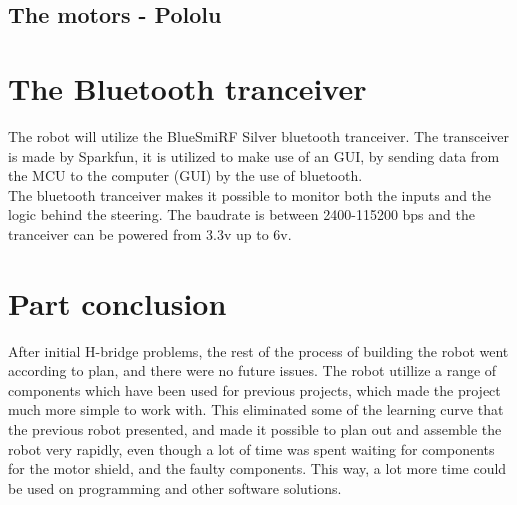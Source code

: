 \subsection{The motors - Pololu}

\section{The Bluetooth tranceiver}
The robot will utilize the BlueSmiRF Silver bluetooth tranceiver. The transceiver is made by Sparkfun, it is utilized to make use of an GUI, by sending data from the MCU to the computer (GUI) by the use of bluetooth.\\ The bluetooth tranceiver makes it possible to monitor both the inputs and the logic behind the steering. The baudrate is between 2400-115200 bps and the tranceiver can be powered from 3.3v up to 6v. 

\section{Part conclusion}
After initial H-bridge problems, the rest of the process of building the robot went according to plan, and there were no future issues. The robot utillize a range of components which have been used for previous projects, which made the project much more simple to work with. This eliminated some of the learning curve that the previous robot presented, and made it possible to plan out and assemble the robot very rapidly, even though a lot of time was spent waiting for components for the motor shield, and the faulty components. This way, a lot more time could be used on programming and other software solutions. 
